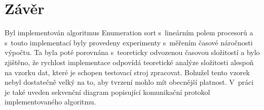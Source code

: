 \documentclass[a4paper, 12pt]{article}
\begin{document}
\section{Závěr}
Byl implementován algoritmus Enumeration sort s~lineárním polem procesorů a s~touto implementací byly provedeny
experimenty s~měřením časové náročnosti výpočtu.
Ta byla poté porovnána s~teoreticky odvozenou časovou složitostí a
bylo zjištěno, že rychlost implementace odpovídá teoretické analýze složitosti alespoň na vzorku dat, které je schopen testovací
stroj zpracovat.
Bohužel tento vzorek nebyl dostatečně velký na to, aby tvrzení mohlo mít obecnější platnost.
V~práci je také uveden sekvenční diagram popisující komunikační protokol implementovaného algoritmu.
\end{document}
